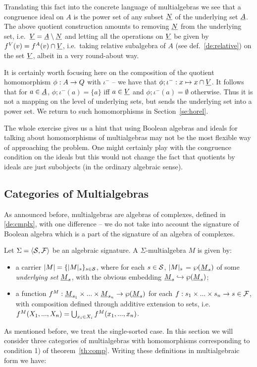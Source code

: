 \documentclass[10pt]{article}
\begin{document}
Translating this fact into the concrete language of multialgebras we
see that a congruence ideal on $A$ is the power set of any subset $\underline {N}$ of the underlying set $\underline {A}$.  The above quotient construction
amounts to removing $\underline {N}$ from the underlying set, i.e.\ $\underline {V}=\underline {A}\setminus\underline {N}$ and letting all the operations on $\underline {V}$ be given by $f^V(v) = f^A(v)\cap \underline {V}$, i.e.\ taking
relative subalgebra of $A$ (see def.~\ref{de:relative}) on the set
$\underline {V}$, albeit in a very round-about way.

It is certainly worth focusing here on the composition of the quotient
homomorphism $\phi: A \rightarrow Q$ with $\iota^-$ -- we have that
$\phi;\iota^- : x \mapsto x\cap\underline {V}$. It follows that for $a
\in\underline {A}$, $\phi;\iota^-(a) = \{a\}$ iff $a\in\underline {V}$ and
$\phi;\iota^-(a) = \emptyset$ otherwise. Thus it is not a mapping on
the level of underlying sets, but sends the underlying set into a
power set. We return to such homomorphisms in Section~\ref{se:horel}.

The whole exercise gives us a hint that using Boolean algebras and
ideals for talking about homomorphisms of multialgebras may not be the
most flexible way of approaching the problem. One might certainly play
with the congruence condition on the ideals but this would not change
the fact that quotients by ideals are just subobjects (in the ordinary
algebraic sense). 



\subsection{Categories of Multialgebras}
\label{sub:cats}
As announced before, 
multialgebras are algebras of complexes, defined in \ref{de:cmplx}, with one
difference -- we do not take into account the signature of Boolean algebra
which is a part of the signature of an algebra of complexes. 
%
\begin{Definition}\label{de:multi}
Let $\Sigma = \langle {\cal S},{\cal F}\rangle$ be an algebraic signature. A $\Sigma$-multialgebra $M$
is given by:
\begin{itemize}
\item 
a carrier $|M|=\{|M|_s\}_{s\in {\cal S}}$, where for each $s\in
{\cal S}$, $|M|_s$ = $\wp(\underline {M}_s)$ of some {\em underlying set}
$\underline {M}_s$, with the obvious embedding $\underline {M}_s\hookrightarrow \wp(\underline {M}_s)$;
\item 
a function $f^M:\underline {M}_{s_1}\times...\times \underline {M}_{s_n}\rightarrow
\wp(\underline {M}_s)$ for each $f:s_1\times...\times s_n\rightarrow s\in {\cal F}$,
with composition defined through additive extension to sets, i.e.\
 $f^M(X_1,...,X_n) = \bigcup_{x_i\in X_i} f^M(x_1,...,x_n)$.
\end{itemize}
\end{Definition}
%
As mentioned before, we treat the single-sorted case.
In this section we will consider three categories of multialgebras
with homomorphisms corresponding to condition 1) of
theorem~\ref{th:comp}. Writing these definitions in multialgebraic
form we have:
\end{document}
